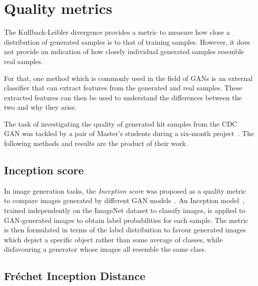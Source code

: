 \section{Quality metrics}\label{sec:quality_metrics} %

The Kullback-Leibler divergence provides a metric to measure how close a
distribution of generated samples is to that of training samples. However, it
does not provide an indication of how closely individual generated samples
resemble real samples. 

For that, one method which is commonly used in the field
of GANs is an external classifier that can extract features from the generated
and real samples. These extracted features can then be used to understand the
differences between the two and why they arise.

The task of investigating the quality of generated hit samples from the CDC GAN
was tackled by a pair of Master's students during a six-month
project~\cite{noam, irene}. The following methods and results are the product of
their work.


\subsection{Inception score}

In image generation tasks, the \emph{Inception score} was proposed as a quality
metric to compare images generated by different GAN
models~\cite{salimans_improved_2016}. 
An Inception model~\cite{7298594}, trained independently on the ImageNet dataset
to classify images, is applied to GAN-generated images to obtain label
probabilities for each sample. The metric is then formulated in terms of the label
distribution to favour generated images which depict a specific object rather than
some average of classes, while disfavouring a generator whose images all resemble
the same class.

\subsection{Fréchet Inception Distance}


